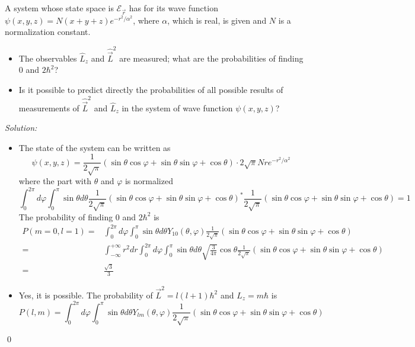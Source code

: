 \documentclass[10pt,a4paper]{article}
\newenvironment{problem}[2][Problem]{\begin{trivlist}
\item[\hskip \labelsep {\bfseries #1}\hskip \labelsep {\bfseries #2.}]}{\end{trivlist}}
\newenvironment{sol}
    {\emph{Solution:}
    }
    {
    \qed
    }
\begin{document}
\begin{problem}{2}
[C-T Exercise 6-5] A system whose state space is $\mathscr{E}_{\vec{r}}$ has for its wave function $\psi(x,y,z)=N(x+y+z)e^{-r^2/\alpha^2}$, where $\alpha$, which is real, is given and $N$ is a normalization constant.
\begin{itemize}
\item[(a)] The observables $\hat{L}_z$ and $\hat{\vec{L}}^2$ are measured; what are the probabilities of finding $0$ and $2\hbar^2$?
\item[(b)] Is it possible to predict directly the probabilities of all possible results of measurements of $\hat{\vec{L}}^2$ and $\hat{L}_z$ in the system of wave function $\psi(x,y,z)$?
\end{itemize}
\end{problem}
\begin{sol}
\begin{itemize}
\item[(a)] The state of the system can be written as
\begin{equation}
\psi(x,y,z)=\frac{1}{2\sqrt{\pi}}(\sin\theta\cos\varphi+\sin\theta\sin\varphi+\cos\theta)\cdot2\sqrt{\pi}Nre^{-r^2/\alpha^2}
\end{equation}
where the part with $\theta$ and $\varphi$ is normalized
\begin{equation}
\int_0^{2\pi}d\varphi\int_0^{\pi}\sin\theta d\theta\frac{1}{2\sqrt{\pi}}(\sin\theta\cos\varphi+\sin\theta\sin\varphi+\cos\theta)^*\frac{1}{2\sqrt{\pi}}(\sin\theta\cos\varphi+\sin\theta\sin\varphi+\cos\theta)=1
\end{equation}
The probability of finding $0$ and $2\hbar^2$ is
\begin{align}
\nonumber P(m=0,l=1)=&\int_0^{2\pi}d\varphi\int_0^{\pi}\sin\theta d\theta Y_{10}(\theta,\varphi)\frac{1}{2\sqrt{\pi}}(\sin\theta\cos\varphi+\sin\theta\sin\varphi+\cos\theta)\\
\nonumber=&\int_{-\infty}^{+\infty}r^2dr\int_0^{2\pi}d\varphi\int_0^{\pi}\sin\theta d\theta\sqrt{\frac{3}{4\pi}}\cos\theta\frac{1}{2\sqrt{\pi}}(\sin\theta\cos\varphi+\sin\theta\sin\varphi+\cos\theta)\\
=&\frac{\sqrt{3}}{3}
\end{align}
\item[(b)] Yes, it is possible. The probability of $\vec{L}^2=l(l+1)\hbar^2$ and $L_z=m\hbar$ is
\begin{equation}
P(l,m)=\int_0^{2\pi}d\varphi\int_0^{\pi}\sin\theta d\theta Y_{lm}(\theta,\varphi)\frac{1}{2\sqrt{\pi}}(\sin\theta\cos\varphi+\sin\theta\sin\varphi+\cos\theta)
\end{equation}
\end{itemize}
\end{sol}
\end{document}
